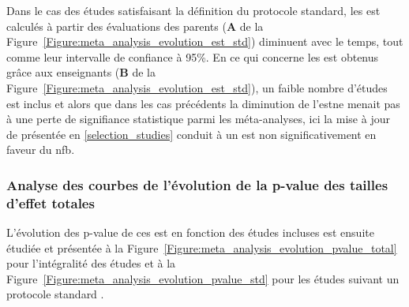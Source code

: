 Dans le cas des études satisfaisant la définition du protocole standard, les \gls{est} calculés à partir des évaluations des parents 
(\textbf{A} de la Figure~\ref{Figure:meta_analysis_evolution_est_std}) diminuent avec le temps, tout comme leur intervalle de confiance à 95\%. 
En ce qui concerne les \gls{est} obtenus grâce aux enseignants (\textbf{B} de la Figure~\ref{Figure:meta_analysis_evolution_est_std}), un faible nombre d'études 
est inclus et alors que dans les cas précédents la diminution de l'\gls{est}ne menait pas à une perte de signifiance statistique parmi les méta-analyses, 
ici la mise à jour de \citet{Cortese2016} présentée en \ref{selection_studies} conduit à un \gls{est} non significativement en faveur du \gls{nfb}. 

\subsubsection{Analyse des courbes de l'évolution de la p-value des tailles d'effet totales}

L'évolution des p-value de ces \gls{est} en fonction des études incluses est ensuite étudiée et présentée à la Figure~\ref{Figure:meta_analysis_evolution_pvalue_total} pour 
l'intégralité des études et à la Figure~\ref{Figure:meta_analysis_evolution_pvalue_std} pour les études suivant un protocole standard \citep{Arns2014}.

